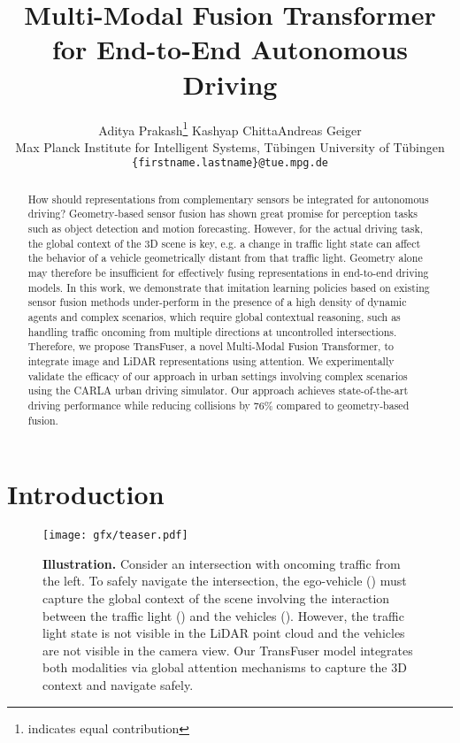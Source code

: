 \documentclass[final]{cvpr}
\begin{document}
\title{Multi-Modal Fusion Transformer for End-to-End Autonomous Driving}

\author{Aditya Prakash\thanks{indicates equal contribution}  \quad \quad Kashyap Chitta\footnotemark[1]  \quad \quad Andreas Geiger\\
Max Planck Institute for Intelligent Systems, T\"ubingen \quad \quad University of T\"ubingen\\
{\tt\small \{firstname.lastname\}@tue.mpg.de}
}

\maketitle

\begin{abstract}
How should representations from complementary sensors be integrated for autonomous driving? Geometry-based sensor fusion has shown great promise for perception tasks such as object detection and motion forecasting. However, for the actual driving task, the global context of the 3D scene is key, e.g. a change in traffic light state can affect the behavior of a vehicle geometrically distant from that traffic light. Geometry alone may therefore be insufficient for effectively fusing representations in end-to-end driving models. In this work, we demonstrate that imitation learning policies based on existing sensor fusion methods under-perform in the presence of a high density of dynamic agents and complex scenarios, which require global contextual reasoning, such as handling traffic oncoming from multiple directions at uncontrolled intersections. Therefore, we propose TransFuser, a novel Multi-Modal Fusion Transformer, to integrate image and LiDAR representations using attention. We experimentally validate the efficacy of our approach in urban settings involving complex scenarios using the CARLA urban driving simulator. Our approach achieves state-of-the-art driving performance while reducing collisions by 76\% compared to geometry-based fusion.
\end{abstract} \section{Introduction}
\label{sec:intro}

\begin{figure}
    \centering
    \texttt{[image: gfx/teaser.pdf]}
    \caption{\textbf{Illustration.} Consider an intersection with oncoming traffic from the left. To safely navigate the intersection, the ego-vehicle ({\color{darkgreen}{green}}) must capture the global context of the scene involving the interaction between the traffic light ({\color{darkyellow}{yellow}}) and the vehicles ({\color{red}{red}}). However, the traffic light state is not visible in the LiDAR point cloud and the vehicles are not visible in the camera view. Our TransFuser model integrates both modalities via global attention mechanisms to capture the 3D context and navigate safely.}
    \label{fig:teaser}
    \vspace{-0.3cm}
\end{figure}
\end{document}
